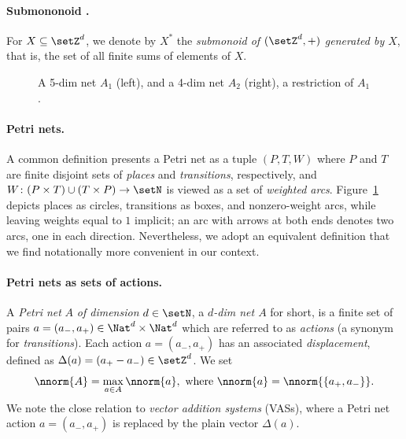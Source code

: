 \paragraph{Submononoid .} 
For $X\subseteq \setZ^d$, we denote by $X^*$ the \emph{submonoid of $(\setZ^d,+)$ generated by $X$}, that is, the set of all finite sums of elements of $X$.



\begin{figure}[t]
\begin{center}

\end{center}
\caption{A 5-dim net $A_1$ (left), and a 4-dim net $A_2$
	(right), a restriction of $A_1$.}
    \label{fig:example}
\end{figure}

\paragraph{Petri nets.}
A common definition presents a Petri net as a tuple $(P,T,W)$ where $P$ and
$T$ are finite disjoint sets of \emph{places} and \emph{transitions},
respectively, and $W\colon (P\times T)\cup(T\times P)\to \setN$
is viewed as a set of \emph{weighted arcs}.
Figure~\ref{fig:example} 
depicts places as circles, transitions as boxes, and nonzero-weight
arcs, while leaving weights equal to $1$ implicit; an arc with arrows
at both ends denotes two arcs, one in each direction. 
Nevertheless, we adopt an equivalent definition that we find notationally more convenient in our context.

\paragraph{Petri nets as sets of actions.}
A \emph{Petri net} $A$ \emph{of dimension} $d\in\setN$, a
\emph{$d$-dim net $A$} for short, is a finite set of pairs
$a=(a_-,a_+) \in \Nat^d \times \Nat^d$ 
which are referred to as 
 \emph{actions} (a synonym for \emph{transitions}).
 Each action $a=(a_-,a_+)$ has an associated \emph{displacement},
defined as $\Delta(a)=(a_+-a_-)\in\setZ^d$. 
We set 
	\[
	\nnorm{A}=\max_{a\in A}\nnorm{a},
	\textnormal{ where }
\nnorm{a}=\nnorm{\{a_+,a_-\}}.
\]
We note the close relation to \emph{vector addition
	systems} (VASs), where a Petri net action
$a=(a_-,a_+)$ is replaced by the plain vector $\Delta(a)$.

